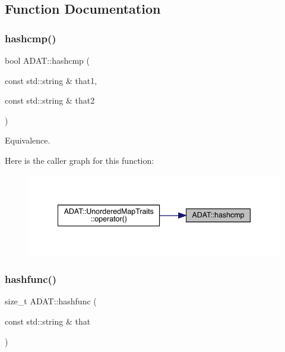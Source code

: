 \subsection{Function Documentation}
\mbox{\label{namespaceADAT_a3145f853c462f1c95b958f5deb7709a5}} 
\subsubsection{\texorpdfstring{hashcmp()}{hashcmp()}}
{\footnotesize\ttfamily bool A\+D\+A\+T\+::hashcmp (\begin{DoxyParamCaption}\item[{const std\+::string \&}]{that1,  }\item[{const std\+::string \&}]{that2 }\end{DoxyParamCaption})}



Equivalence. 

Here is the caller graph for this function\+:\nopagebreak
\begin{figure}[H]
\begin{center}
\leavevmode
\includegraphics[width=341pt]{d5/d0d/namespaceADAT_a3145f853c462f1c95b958f5deb7709a5_icgraph}
\end{center}
\end{figure}
\mbox{\label{namespaceADAT_ac0708a73475d6ed645b663e2d919f90b}} 
\subsubsection{\texorpdfstring{hashfunc()}{hashfunc()}}
{\footnotesize\ttfamily size\+\_\+t A\+D\+A\+T\+::hashfunc (\begin{DoxyParamCaption}\item[{const std\+::string \&}]{that }\end{DoxyParamCaption})}



